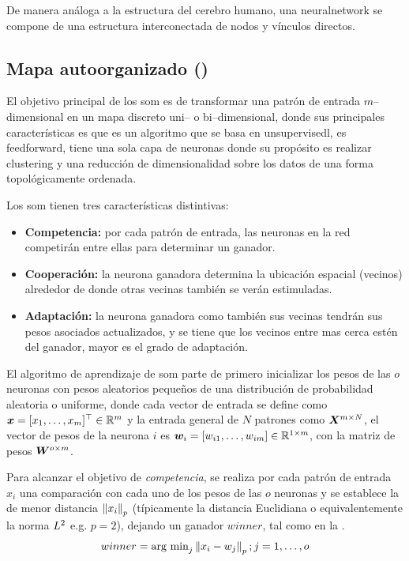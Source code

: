 De manera análoga a la estructura del cerebro humano, una \gls{neuralnetwork} se compone de una estructura interconectada de nodos y vínculos directos.

\subsection{Mapa autoorganizado ()} \label{subsec:SOM}
El objetivo principal de los \gls{som} es de transformar una patrón de entrada $m$--dimensional en un mapa discreto uni-- o bi--dimensional, donde sus principales características es que es un algoritmo que se basa en \gls{unsupervisedl}, es \gls{feedforward}, tiene una sola capa de neuronas donde su propósito es realizar \gls{clustering} y una reducción de dimensionalidad sobre los datos de una forma topológicamente ordenada.

Los \gls{som} tienen tres características distintivas:
\begin{itemize}
\item {\bf Competencia:} por cada patrón de entrada, las neuronas en la red competirán entre ellas para determinar un ganador.
\item {\bf Cooperación:} la neurona ganadora determina la ubicación espacial (vecinos) alrededor de donde otras vecinas también se verán estimuladas.
\item {\bf Adaptación:} la neurona ganadora como también sus vecinas tendrán sus pesos asociados actualizados, y se tiene que los vecinos entre mas cerca estén del ganador, mayor es el grado de adaptación.
\end{itemize}

El algoritmo de aprendizaje de \gls{som} parte de primero inicializar los pesos de las $o$ neuronas con pesos aleatorios pequeños de una distribución de probabilidad aleatoria o uniforme, donde cada vector de entrada se define como ${\bm{x}} = [x_1, \ldots, x_m]^{\top} \in \mathbb{R}^{m}$ y la entrada general de $N$ patrones como ${\bm{X}}^{m \times N}$, el vector de pesos de la neurona $i$ es ${\bm{w}}_i = [w_{i1}, \ldots, w_{im}] \in \mathbb{R}^{1 \times m}$, con la matriz de pesos ${\bm{W}}^{o \times m}$.

Para alcanzar el objetivo de \emph{competencia}, se realiza por cada patrón de entrada $x_i$ una comparación con cada uno de los pesos de las $o$ neuronas y se establece la de menor distancia $\left\lVert x_i\right\rVert_p$ (típicamente la distancia Euclidiana o equivalentemente la norma $L^2$ e.g. $p = 2$), dejando un ganador $winner$, tal como en la .
\begin{equation} \label{eq:som-competition}
  winner = \text{arg min}_j \left\lVert x_i - w_j\right\rVert_p ; j = 1, \ldots,o
\end{equation}

